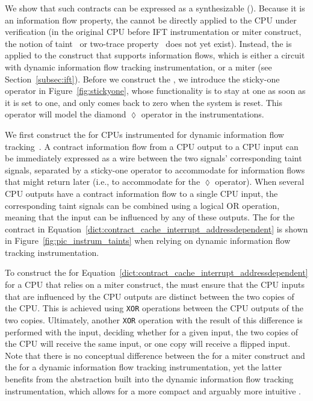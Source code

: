 We show that such contracts can be expressed as a synthesizable \pici (\PICI).
Because it is an information flow property, the \PICI cannot be directly applied to the CPU under verification (in the original CPU before IFT instrumentation or miter construct, the notion of taint~\cite{solt2022cellift,ceesay2024mucfi} or two-trace property~\cite{wang2023specification,dinesh2024conjunct,dinesh2024conjunct,tan2025contractshadowlogic} does not yet exist).
Instead, the \PICI is applied to the construct that supports information flows, which is either a circuit with dynamic information flow tracking instrumentation, or a miter (see Section~\ref{subsec:ift}).
Before we construct the \PICI, we introduce the sticky-one operator in Figure~\ref{fig:stickyone}, whose functionality is to stay at one as soon as it is set to one, and only comes back to zero when the system is reset.
This operator will model the diamond $\lozenge$ operator in the instrumentations.

We first construct the \PICI for CPUs instrumented for dynamic information flow tracking~\cite{tiwari2009complete,solt2022cellift}.
A contract information flow from a CPU output to a CPU input can be immediately expressed as a wire between the two signals' corresponding taint signals, separated by a sticky-one operator to accommodate for information flows that might return later (i.e., to accommodate for the $\lozenge$ operator).
When several CPU outputs have a contract information flow to a single CPU input, the corresponding taint signals can be combined using a logical OR operation, meaning that the input can be influenced by any of these outputs.
The \PICI for the contract in Equation~\ref{dict:contract_cache_interrupt_addressdependent} is shown in Figure~\ref{fig:pic_instrum_taints} when relying on dynamic information flow tracking instrumentation.

To construct the \PICI for Equation~\ref{dict:contract_cache_interrupt_addressdependent} for a CPU that relies on a miter construct, the \PICI must ensure that the CPU inputs that are influenced by the CPU outputs are distinct between the two copies of the CPU.
This is achieved using \texttt{XOR} operations between the CPU outputs of the two copies.
Ultimately, another \texttt{XOR} operation with the result of this difference is performed with the input, deciding whether for a given input, the two copies of the CPU will receive the same input, or one copy will receive a flipped input.
Note that there is no conceptual difference between the \PICI for a miter construct and the \PICI for a dynamic information flow tracking instrumentation, yet the latter benefits from the abstraction built into the dynamic information flow tracking instrumentation, which allows for a more compact and arguably more intuitive \PICI.

